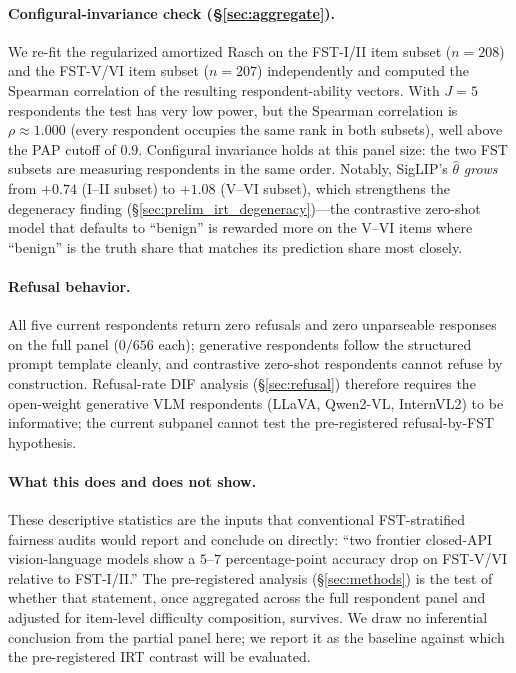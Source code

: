 \documentclass{article}
\begin{document}
\paragraph{Configural-invariance check (\S\ref{sec:aggregate}).}
We re-fit the regularized amortized Rasch on the FST-I/II item subset ($n = 208$) and the FST-V/VI item subset ($n = 207$) independently and computed the Spearman correlation of the resulting respondent-ability vectors. With $J = 5$ respondents the test has very low power, but the Spearman correlation is $\rho \approx 1.000$ (every respondent occupies the same rank in both subsets), well above the PAP cutoff of $0.9$. Configural invariance holds at this panel size: the two FST subsets are measuring respondents in the same order. Notably, SigLIP's $\hat\theta$ \emph{grows} from $+0.74$ (I--II subset) to $+1.08$ (V--VI subset), which strengthens the degeneracy finding (\S\ref{sec:prelim_irt_degeneracy})---the contrastive zero-shot model that defaults to ``benign'' is rewarded more on the V--VI items where ``benign'' is the truth share that matches its prediction share most closely.

\paragraph{Refusal behavior.}
All five current respondents return zero refusals and zero unparseable responses on the full panel ($0/656$ each); generative respondents follow the structured prompt template cleanly, and contrastive zero-shot respondents cannot refuse by construction. Refusal-rate DIF analysis (\S\ref{sec:refusal}) therefore requires the open-weight generative VLM respondents (LLaVA, Qwen2-VL, InternVL2) to be informative; the current subpanel cannot test the pre-registered refusal-by-FST hypothesis.

\paragraph{What this does and does not show.}
These descriptive statistics are the inputs that conventional FST-stratified fairness audits would report and conclude on directly: ``two frontier closed-API vision-language models show a $5$--$7$ percentage-point accuracy drop on FST-V/VI relative to FST-I/II.'' The pre-registered analysis (\S\ref{sec:methods}) is the test of whether that statement, once aggregated across the full respondent panel and adjusted for item-level difficulty composition, survives. We draw no inferential conclusion from the partial panel here; we report it as the baseline against which the pre-registered IRT contrast will be evaluated.
\end{document}
